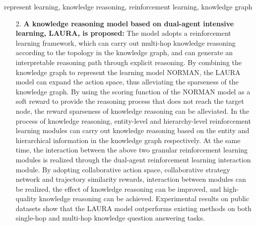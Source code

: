 \documentclass[algorithmlist, AutoFakeBold, AutoFakeSlant, figurelist, tablelist, nomlist, engineering]{seuthesix}
\begin{document}
\begin{englishabstract}{represent learning, knowledge reasoning, reinforcement learning, knowledge graph}
\begin{itemize}
    Then, the causal inference module is used to construct a causal graph of the graph neural network module, and the method of causal intervention of neighborhood information is adopted to comprehensively consider a variety of factors such as hierarchical difference score, decision difference score, predictive confidence score and inference distance score to evaluate whether the current node receives information from the neighborhood nodes and improve stability of the model.
    At the same time, through the graph neural network module, the hierarchical information of the hierarchical information extraction module is used as the auxiliary, and the causal inference module is used to evaluate whether to receive neighborhood information. The completed training model can convert the input knowledge triples into the knowledge representation vectors and can be used for the task of knowledge reasoning.
    Experimental results on public datasets show that the NORMAN model outperforms existing methods on knowledge graph completion tasks.
    \item [2.]\textbf{A knowledge reasoning model based on dual-agent intensive learning, LAURA, is proposed:}
    The model adopts a reinforcement learning framework, which can carry out multi-hop knowledge reasoning according to the topology in the knowledge graph, and can generate an interpretable reasoning path through explicit reasoning.
    By combining the knowledge graph to represent the learning model NORMAN, the LAURA model can expand the action space, thus alleviating the sparseness of the knowledge graph. By using the scoring function of the NORMAN model as a soft reward to provide the reasoning process that does not reach the target node, the reward sparseness of knowledge reasoning can be alleviated.
    In the process of knowledge reasoning, entity-level and hierarchy-level reinforcement learning modules can carry out knowledge reasoning based on the entity and hierarchical information in the knowledge graph respectively.
    At the same time, the interaction between the above two granular reinforcement learning modules is realized through the dual-agent reinforcement learning interaction module. By adopting collaborative action space, collaborative strategy network and trajectory similarity rewards, interaction between modules can be realized, the effect of knowledge reasoning can be improved, and high-quality knowledge reasoning can be achieved.
    Experimental results on public datasets show that the LAURA model outperforms existing methods on both single-hop and multi-hop knowledge question answering tasks.
  \end{itemize}
\end{englishabstract} 
\end{document}
